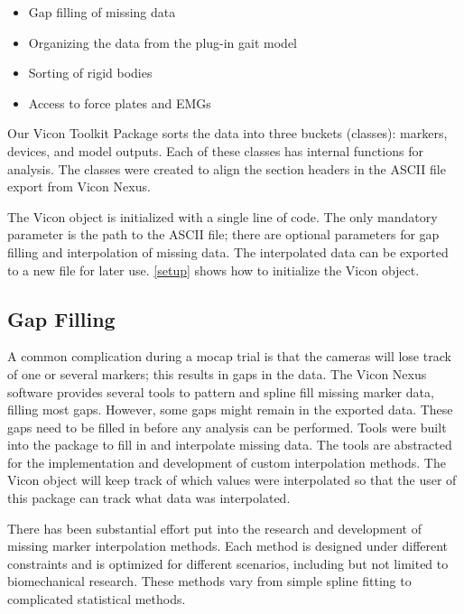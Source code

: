 \begin{itemize}[noitemsep]
    \item Gap filling of missing data 
    \item Organizing the data from the plug-in gait model 
    \item Sorting of rigid bodies
    \item Access to force plates and EMGs 
\end{itemize}


Our Vicon Toolkit Package sorts the data into three buckets (classes): markers, devices, and model outputs. Each of these classes has internal functions for analysis. The classes were created to align the section headers in the ASCII file export from Vicon Nexus. 

The Vicon object is initialized with a single line of code. The only mandatory parameter is the path to the ASCII file; there are optional parameters for gap filling and interpolation of missing data. The interpolated data can be exported to a new file for later use.  \autoref{setup} shows how to initialize the Vicon object.




\subsection{Gap Filling}

A common complication during a mocap trial is that the cameras will lose track of one or several markers; this results in gaps in the data. The Vicon Nexus software provides several tools to pattern and spline fill missing marker data, filling most gaps. However, some gaps might remain in the exported data. These gaps need to be filled in before any analysis can be performed. Tools were built into the package to fill in and interpolate missing data. The tools are abstracted for the implementation and development of custom interpolation methods. The Vicon object will keep track of which values were interpolated so that the user of this package can track what data was interpolated. 


There has been substantial effort put into the research and development of missing marker interpolation methods. Each method is designed under different constraints and is optimized for different scenarios, including but not limited to biomechanical research. These methods vary from simple spline fitting to complicated statistical methods. 

